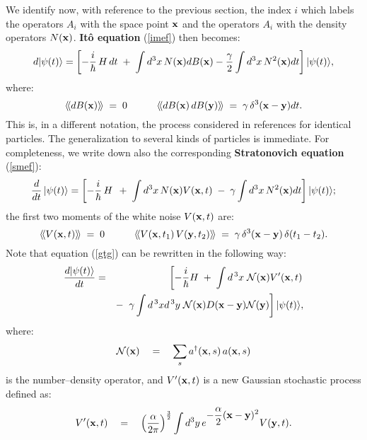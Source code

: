\documentclass[12pt]{article}
\newcommand{\llangle}{\langle\!\langle}
\newcommand{\rrangle}{\rangle\!\rangle}
\begin{document}
We identify now, with reference to the previous section, the index
$i$ which labels the operators $A_i$ with the space point ${\bf
x}$ and the operators $A_{i}$ with the density operators $N({\bf
x})$. {\bf It\^o equation} (\ref{imef}) then becomes:
\begin{equation} \label{iecsl}
d |\psi(t) \rangle = \left[ -\frac{i}{\hbar}\, H\, dt \; + \; \int
d^3 x \, N({\bf x}) dB({\bf x}) - \frac{\gamma}{2} \int d^3 x \,
N^2({\bf x}) dt \right] | \psi(t) \rangle,
\end{equation}
where:
\begin{equation}
\llangle dB({\bf x})\rrangle \; = \; 0 \qquad\quad \llangle
dB({\bf x})\,dB({\bf y})\rrangle \; = \;  \gamma \, \delta^3({\bf
x} - {\bf y}) dt.
\end{equation}
This is, in a different notation, the process considered in
references \cite{csl0,csl}  for identical particles. The
generalization to several kinds of particles is immediate. For
completeness, we write down also the corresponding {\bf
Stratonovich equation} (\ref{smef}):
\begin{equation} \label{gtg}
\frac{d}{dt}\, |\psi(t) \rangle = \left[ -\frac{i}{\hbar}\, H\, \;
+ \; \int d^3 x \, N({\bf x}) V({\bf x}, t) \; - \; \gamma \int
d^3  x \, N^2({\bf x}) dt \right] | \psi(t) \rangle;
\end{equation}
the first two moments of the white noise $V({\bf x}, t)$ are:
\begin{equation} \label{sch1d2}
\llangle V({\bf x}, t)\rrangle \; = \; 0 \qquad\quad \llangle
V({\bf x}, t_{1})\, V({\bf y}, t_{2})\rrangle \; = \;  \gamma \,
\delta^3({\bf x} - {\bf y})\, \delta (t_{1} - t_{2}).
\end{equation}
Note that equation (\ref{gtg}) can be rewritten in the following
way:
\begin{eqnarray} \label{sch1d}
\frac{d|\psi(t)\rangle}{dt} & = & \left[ -\frac{i}{\hbar} H\; +\;
\int d^{\,3}x\; {\mathcal N}({\bf x}) V'({\bf x},t) \right.
\nonumber \\
& & - \; \left.\gamma \int d^{\,3}x d^{\,3}y \; {\mathcal N}({\bf
x}) D({\bf x} - {\bf y}) {\mathcal N}({\bf y}) \right]
|\psi(t)\rangle,
\end{eqnarray}
where:
\begin{equation}
{\mathcal N}({\bf x}) \quad = \quad \sum_{s} a^{\dagger}({\bf x},
s)\,a({\bf x}, s)
\end{equation}
is the number--density operator, and $V'({\bf x},t)$ is a new
Gaussian stochastic process defined as:
\begin{equation} \label{nsf}
V'({\bf x}, t) \quad = \quad
\left(\frac{\alpha}{2\pi}\right)^{\frac{3}{2}} \int d^{3}y\,
e^{\displaystyle -\frac{\alpha}{2}({\bf x} - {\bf y})^{2}} V({\bf
y}, t).
\end{equation}
\end{document}
